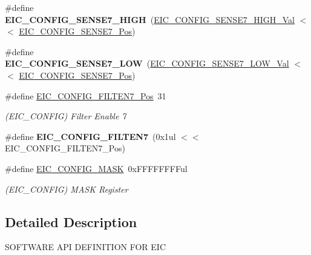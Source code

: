 \begin{DoxyCompactItemize}
\item 
\hypertarget{group___s_a_m_l21___e_i_c_gab54aa3b8ebf878f33caa571b6dd6e261}{}\#define {\bfseries E\+I\+C\+\_\+\+C\+O\+N\+F\+I\+G\+\_\+\+S\+E\+N\+S\+E7\+\_\+\+H\+I\+G\+H}~(\hyperlink{group___s_a_m_l21___e_i_c_ga90352dd0ca9acbd823c87862d2046489}{E\+I\+C\+\_\+\+C\+O\+N\+F\+I\+G\+\_\+\+S\+E\+N\+S\+E7\+\_\+\+H\+I\+G\+H\+\_\+\+Val}    $<$$<$ \hyperlink{group___s_a_m_l21___e_i_c_ga19583c715708b15f578f5cc2a8f394fc}{E\+I\+C\+\_\+\+C\+O\+N\+F\+I\+G\+\_\+\+S\+E\+N\+S\+E7\+\_\+\+Pos})\label{group___s_a_m_l21___e_i_c_gab54aa3b8ebf878f33caa571b6dd6e261}

\item 
\hypertarget{group___s_a_m_l21___e_i_c_ga4e10aa00420a52db6cf0eb9610777771}{}\#define {\bfseries E\+I\+C\+\_\+\+C\+O\+N\+F\+I\+G\+\_\+\+S\+E\+N\+S\+E7\+\_\+\+L\+O\+W}~(\hyperlink{group___s_a_m_l21___e_i_c_ga090c5aaf967e49c1634a02bae7799fa6}{E\+I\+C\+\_\+\+C\+O\+N\+F\+I\+G\+\_\+\+S\+E\+N\+S\+E7\+\_\+\+L\+O\+W\+\_\+\+Val}     $<$$<$ \hyperlink{group___s_a_m_l21___e_i_c_ga19583c715708b15f578f5cc2a8f394fc}{E\+I\+C\+\_\+\+C\+O\+N\+F\+I\+G\+\_\+\+S\+E\+N\+S\+E7\+\_\+\+Pos})\label{group___s_a_m_l21___e_i_c_ga4e10aa00420a52db6cf0eb9610777771}

\item 
\hypertarget{group___s_a_m_l21___e_i_c_ga77bd3664d9f1c1d6b212eac416d40341}{}\#define \hyperlink{group___s_a_m_l21___e_i_c_ga77bd3664d9f1c1d6b212eac416d40341}{E\+I\+C\+\_\+\+C\+O\+N\+F\+I\+G\+\_\+\+F\+I\+L\+T\+E\+N7\+\_\+\+Pos}~31\label{group___s_a_m_l21___e_i_c_ga77bd3664d9f1c1d6b212eac416d40341}

\begin{DoxyCompactList}\small\item\em (E\+I\+C\+\_\+\+C\+O\+N\+F\+I\+G) Filter Enable 7 \end{DoxyCompactList}\item 
\hypertarget{group___s_a_m_l21___e_i_c_gac996c8f278ab9f4af7588a785eef8c04}{}\#define {\bfseries E\+I\+C\+\_\+\+C\+O\+N\+F\+I\+G\+\_\+\+F\+I\+L\+T\+E\+N7}~(0x1ul $<$$<$ E\+I\+C\+\_\+\+C\+O\+N\+F\+I\+G\+\_\+\+F\+I\+L\+T\+E\+N7\+\_\+\+Pos)\label{group___s_a_m_l21___e_i_c_gac996c8f278ab9f4af7588a785eef8c04}

\item 
\hypertarget{group___s_a_m_l21___e_i_c_ga713278aaffe59a230cb4f7642ee4900e}{}\#define \hyperlink{group___s_a_m_l21___e_i_c_ga713278aaffe59a230cb4f7642ee4900e}{E\+I\+C\+\_\+\+C\+O\+N\+F\+I\+G\+\_\+\+M\+A\+S\+K}~0x\+F\+F\+F\+F\+F\+F\+F\+Ful\label{group___s_a_m_l21___e_i_c_ga713278aaffe59a230cb4f7642ee4900e}

\begin{DoxyCompactList}\small\item\em (E\+I\+C\+\_\+\+C\+O\+N\+F\+I\+G) M\+A\+S\+K Register \end{DoxyCompactList}\end{DoxyCompactItemize}


\subsection{Detailed Description}
S\+O\+F\+T\+W\+A\+R\+E A\+P\+I D\+E\+F\+I\+N\+I\+T\+I\+O\+N F\+O\+R E\+I\+C 
